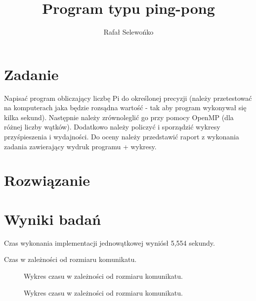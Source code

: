 \documentclass[a4paper,12pt]{article}
\title{Program typu ping-pong}
\author{Rafał Selewońko}
\begin{document}
\maketitle
 
\section{Zadanie}\label{sec:zadanie}
Napisać program obliczający liczbę Pi do określonej precyzji (należy przetestować na komputerach jaka będzie rozsądna wartość - tak aby program wykonywał się kilka sekund). Następnie należy zrównoleglić go przy pomocy OpenMP (dla różnej liczby wątków). Dodatkowo należy policzyć i sporządzić wykresy przyśpieszenia i wydajności. Do oceny należy przedstawić raport z wykonania zadania zawierający wydruk programu + wykresy.

\pagebreak
\section{Rozwiązanie}\label{sec:kod}



\section{Wyniki badań}

Czas wykonania implementacji jednowątkowej wyniósł 5,554 sekundy.

\begin{table}[t]
\centering
{}
\caption{Czas w zależności od rozmiaru komunikatu.}
\label{tabela_czas}
\end{table}

\begin{figure}[ht!]
    \centering
    \caption{Wykres czasu w zależności od rozmiaru komunikatu.}
    \label{wykres_czas}
\end{figure}

\begin{figure}[ht!]
    \centering
    \caption{Wykres czasu w zależności od rozmiaru komunikatu.}
    \label{wykres_czas}
\end{figure}
\end{document}
